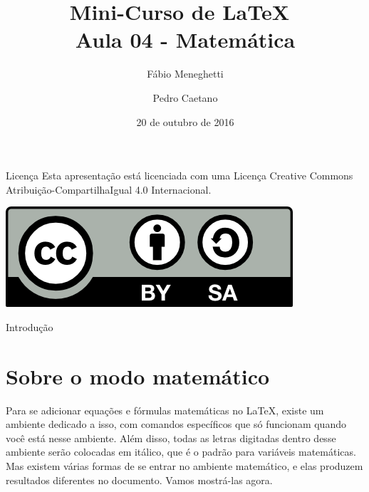 \documentclass[12pt]{beamer}
\title{Mini-Curso de \LaTeX\ \\ Aula 04 - Matemática}
\author{Fábio Meneghetti \and Pedro Caetano}
\date{20 de outubro de 2016}
\begin{document}
\begin{frame}
  \titlepage
\end{frame}

\begin{frame}{Licença}
  Esta apresentação está licenciada com uma Licença Creative Commons Atribuição-CompartilhaIgual 4.0 Internacional.
  \begin{center}
    \includegraphics[scale=0.3]{../license.png}
  \end{center}
\end{frame}

\begin{frame}
  \tableofcontents
\end{frame}

\begin{frame}{Introdução}
  \section{Sobre o modo matemático}
  Para se adicionar equações e fórmulas matemáticas no \LaTeX, existe um ambiente dedicado a isso, com comandos específicos que só funcionam quando você está nesse ambiente. Além disso, todas as letras digitadas dentro desse ambiente serão colocadas em itálico, que é o padrão para variáveis matemáticas.
  \\[1cm]
  Mas existem várias formas de se entrar no ambiente matemático, e elas produzem resultados diferentes no documento. Vamos mostrá-las agora.
\end{frame}
\end{document}
